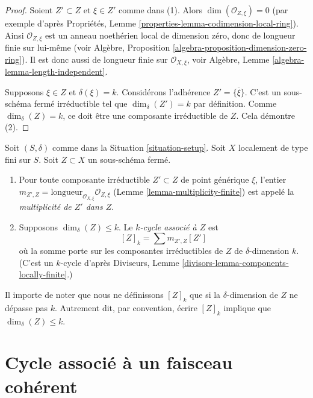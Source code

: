 \begin{proof}
Soient $Z' \subset Z$ et $\xi \in Z'$ comme dans (1).
Alors $\dim(\mathcal{O}_{Z, \xi}) = 0$ (par exemple d'après
Propriétés, Lemme \ref{properties-lemma-codimension-local-ring}).
Ainsi $\mathcal{O}_{Z, \xi}$ est un anneau noethérien
local de dimension zéro, donc de longueur finie sur
lui-même (voir
Algèbre, Proposition \ref{algebra-proposition-dimension-zero-ring}).
Il est donc aussi de longueur finie sur $\mathcal{O}_{X, \xi}$, voir
Algèbre, Lemme \ref{algebra-lemma-length-independent}.

\medskip\noindent
Supposons $\xi \in Z$ et $\delta(\xi) = k$.
Considérons l'adhérence $Z' = \overline{\{\xi\}}$. C'est un sous-schéma
fermé irréductible tel que $\dim_\delta(Z') = k$ par définition.
Comme $\dim_\delta(Z) = k$, ce doit être une composante irréductible
de $Z$. Cela démontre (2).
\end{proof}

\begin{definition}
\label{definition-cycle-associated-to-closed-subscheme}
Soit $(S, \delta)$ comme dans la Situation \ref{situation-setup}.
Soit $X$ localement de type fini sur $S$.
Soit $Z \subset X$ un sous-schéma fermé.
\begin{enumerate}
\item Pour toute composante irréductible $Z' \subset Z$ de point générique $\xi$,
l'entier
$m_{Z', Z} = \text{longueur}_{\mathcal{O}_{X, \xi}} \mathcal{O}_{Z, \xi}$
(Lemme \ref{lemma-multiplicity-finite})
est appelé la {\it multiplicité de $Z'$ dans $Z$}.
\item Supposons $\dim_\delta(Z) \leq k$.
Le {\it $k$-cycle associé à $Z$} est
$$
[Z]_k
=
\sum m_{Z', Z}[Z']
$$
où la somme porte sur les composantes irréductibles de $Z$
de $\delta$-dimension $k$. (C'est un $k$-cycle d'après
Diviseurs, Lemme \ref{divisors-lemma-components-locally-finite}.)
\end{enumerate}
\end{definition}

\noindent
Il importe de noter que nous ne définissons $[Z]_k$ que si la $\delta$-dimension
de $Z$ ne dépasse pas $k$. Autrement dit, par convention, écrire
$[Z]_k$ implique que $\dim_\delta(Z) \leq k$.



\section{Cycle associé à un faisceau cohérent}
\label{section-cycle-of-coherent-sheaf}



